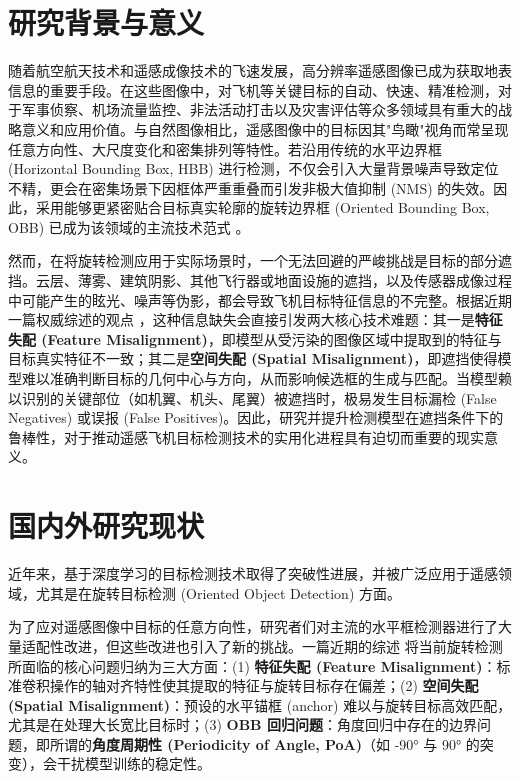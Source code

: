 \documentclass[12pt, a4paper]{report}
\begin{document}

\section{研究背景与意义}
随着航空航天技术和遥感成像技术的飞速发展，高分辨率遥感图像已成为获取地表信息的重要手段。在这些图像中，对飞机等关键目标的自动、快速、精准检测，对于军事侦察、机场流量监控、非法活动打击以及灾害评估等众多领域具有重大的战略意义和应用价值。与自然图像相比，遥感图像中的目标因其"鸟瞰"视角而常呈现任意方向性、大尺度变化和密集排列等特性。若沿用传统的水平边界框 (Horizontal Bounding Box, HBB) 进行检测，不仅会引入大量背景噪声导致定位不精，更会在密集场景下因框体严重重叠而引发非极大值抑制 (NMS) 的失效。因此，采用能够更紧密贴合目标真实轮廓的旋转边界框 (Oriented Bounding Box, OBB) 已成为该领域的主流技术范式 \cite{wang2023survey}。

然而，在将旋转检测应用于实际场景时，一个无法回避的严峻挑战是目标的部分遮挡。云层、薄雾、建筑阴影、其他飞行器或地面设施的遮挡，以及传感器成像过程中可能产生的眩光、噪声等伪影，都会导致飞机目标特征信息的不完整。根据近期一篇权威综述的观点 \cite{wang2023survey}，这种信息缺失会直接引发两大核心技术难题：其一是\textbf{特征失配 (Feature Misalignment)}，即模型从受污染的图像区域中提取到的特征与目标真实特征不一致；其二是\textbf{空间失配 (Spatial Misalignment)}，即遮挡使得模型难以准确判断目标的几何中心与方向，从而影响候选框的生成与匹配。当模型赖以识别的关键部位（如机翼、机头、尾翼）被遮挡时，极易发生目标漏检 (False Negatives) 或误报 (False Positives)。因此，研究并提升检测模型在遮挡条件下的鲁棒性，对于推动遥感飞机目标检测技术的实用化进程具有迫切而重要的现实意义。

\section{国内外研究现状}
近年来，基于深度学习的目标检测技术取得了突破性进展，并被广泛应用于遥感领域，尤其是在旋转目标检测 (Oriented Object Detection) 方面。

为了应对遥感图像中目标的任意方向性，研究者们对主流的水平框检测器进行了大量适配性改进，但这些改进也引入了新的挑战。一篇近期的综述 \cite{wang2023survey} 将当前旋转检测所面临的核心问题归纳为三大方面：(1) \textbf{特征失配 (Feature Misalignment)}：标准卷积操作的轴对齐特性使其提取的特征与旋转目标存在偏差；(2) \textbf{空间失配 (Spatial Misalignment)}：预设的水平锚框 (anchor) 难以与旋转目标高效匹配，尤其是在处理大长宽比目标时；(3) \textbf{OBB 回归问题}：角度回归中存在的边界问题，即所谓的\textbf{角度周期性 (Periodicity of Angle, PoA)}（如 -90° 与 90° 的突变），会干扰模型训练的稳定性。
\end{document}
